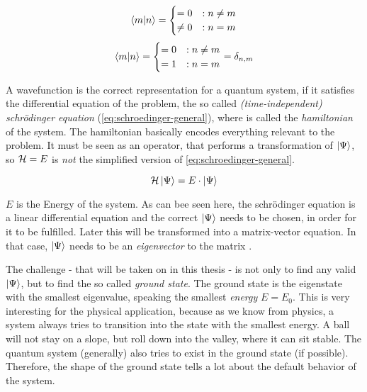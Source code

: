 \begin{equation}
    \label{eq:base-orthagonal}
    \bra{m}\ket{n} = \begin{cases}
         = 0 &: n\neq m\\
         \neq 0 &: n = m
    \end{cases}
\end{equation}
\begin{equation}
    \label{eq:base-orthonormal}
    \bra{m}\ket{n} = \begin{cases}
         = 0 &: n\neq m\\
         = 1 &: n = m
    \end{cases} = \delta_{n, m}
\end{equation}

A wavefunction is the correct representation for a quantum system, if it satisfies the differential equation of the problem, the so called \emph{(time-independent) schrödinger equation} (\autoref{eq:schroedinger-general}), where \hamiltonian is called the \emph{hamiltonian} of the system. The hamiltonian basically \glqq encodes\grqq{} everything relevant to the problem. It must be seen as an operator, that performs a transformation of $\ket{\Psi}$, so $\mathcal{H} = E$ is \emph{not} the simplified version of \autoref{eq:schroedinger-general}.

\begin{equation}
    \label{eq:schroedinger-general}
    \mathcal{H} \ket{\Psi} = E \cdot \ket{\Psi}
\end{equation}

$E$ is the Energy of the system. As can bee seen here, the schrödinger equation is a linear differential equation and the correct $\ket{\Psi}$ needs to be chosen, in order for it to be fulfilled. Later this will be transformed into a matrix-vector equation. In that case, $\ket{\Psi}$ needs to be an \emph{eigenvector} to the matrix \hamiltonian.

The challenge - that will be taken on in this thesis - is not only to find any valid $\ket{\Psi}$, but to find the so called \emph{ground state}. The ground state is the eigenstate with the smallest eigenvalue, speaking the smallest \emph{energy} $E = E_0$. 
This is very interesting for the physical application, because as we know from physics, a system always tries to transition into the state  with the smallest energy. A ball will not stay on a slope, but roll down into the valley, where it can sit stable. The quantum system (generally) also tries to exist in the ground state (if possible). Therefore, the shape of the ground state tells a lot about the \glqq default\grqq{} behavior of the system.